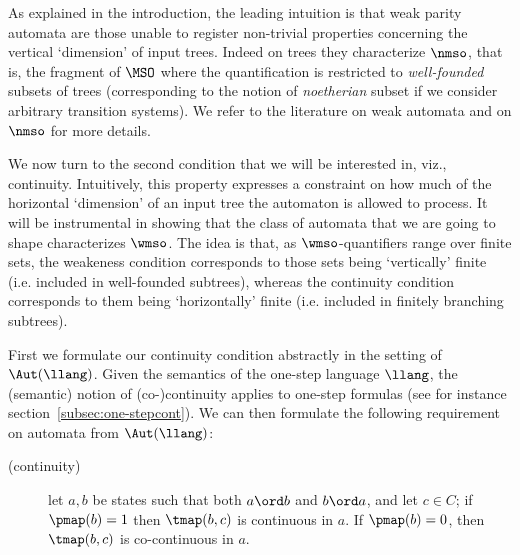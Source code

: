 As explained in the introduction, the leading intuition is that weak parity automata are those unable to register non-trivial properties concerning the vertical `dimension' of input trees. Indeed on trees they characterize $\nmso$, that is, the fragment of $\MSO$ where the quantification is restricted to \emph{well-founded} subsets of trees (corresponding to the notion of \emph{noetherian} subset if we consider arbitrary transition systems). We refer to the literature on weak automata \cite{MullerSaoudiSchupp92} and on $\nmso$ \cite{DBLP:conf/lics/FacchiniVZ13,Zanasi:Thesis:2012} for more details.

We now turn to the second condition that we will be interested in,
viz., continuity. Intuitively, this property expresses a constraint on how much of the horizontal `dimension' of an input tree the automaton is allowed to process. It will be instrumental in showing that the class of automata that we are going to shape characterizes $\wmso$. The idea is that, as $\wmso$-quantifiers range over finite sets, the weakeness condition corresponds to those sets being `vertically' finite (i.e. included in well-founded subtrees), whereas the continuity condition corresponds to them being `horizontally' finite (i.e. included in finitely branching subtrees).

\begin{comment}
We now turn to the second property that we require of $\mso$-automata,
viz., continuity.
Here the story is that requiring the transition map of our automata to meet
some continuity condition with respect to some states of the automaton, gives
us a grip on the `horizontal' dimension of quantification in $\wmso$,
i.e., the dimension corresponding to the fact that finite subsets of a
tree $\bbT$ are subsets of a \emph{finitely} branching subtree of $\bbT$.

\btbs
\item
Can we provide more insight here, or is it too technical?
\etbs
\end{comment}

First we formulate our continuity condition abstractly in the setting of $\Aut(\llang)$.
Given the semantics of the one-step language $\llang$, the (semantic) notion
of (co-)continuity applies to one-step formulas (see for instance
section~\ref{subsec:one-stepcont}). We can then formulate the following requirement on automata from $\Aut(\llang)$:

\begin{description}
\item[(continuity)] let $a,b$ be states such that both $a\ord b$ and
$b \ord a$, and let $c\in C$;
    if ${\pmap(b)}=1$ then $\tmap(b,c)$ is continuous in $a$.
    If $\pmap(b)=0$, then $\tmap(b,c)$ is co-continuous in $a$.
\end{description}

